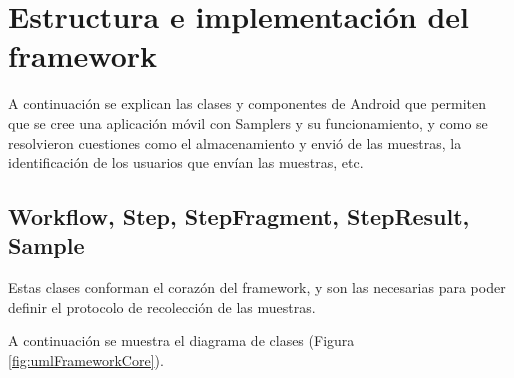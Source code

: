 \section{Estructura e implementación del framework}

A continuación se explican las clases y componentes de Android que permiten que se cree una aplicación móvil con Samplers y su funcionamiento, y como se resolvieron cuestiones como el almacenamiento y envió de las muestras, la identificación de los usuarios que envían las muestras, etc.

\subsection{Workflow, Step, StepFragment, StepResult, Sample} \label{sec:clases_core}
Estas clases conforman el corazón del framework, y son las necesarias para poder definir el protocolo de recolección de las muestras.

A continuación se muestra el diagrama de clases (Figura \ref{fig:umlFrameworkCore}).

